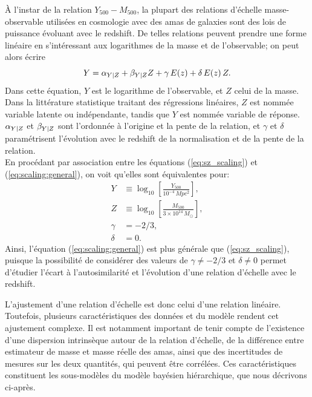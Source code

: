 À l'instar de la relation $Y_{500} - M_{500}$, la plupart des relations d'échelle masse-observable utilisées en cosmologie avec des amas de galaxies sont des lois de puissance évoluant avec le redshift.
De telles relations peuvent prendre une forme linéaire en s'intéressant aux logarithmes de la masse et de l'observable; on peut alors écrire
\begin{equation}
    \label{eq:scaling:general}
    Y = \alpha_{Y|Z} + \beta_{Y|Z} Z + \gamma \, E(z) + \delta \, E(z) \, Z.
\end{equation}
Dans cette équation, $Y$ est le logarithme de l'observable, et $Z$ celui de la masse\footnotemark.
Dans la littérature statistique traitant des régressions linéaires, $Z$ est nommée variable latente ou indépendante, tandis que $Y$ est nommée variable de réponse.
$\alpha_{Y|Z}$ et $\beta_{Y|Z}$ sont l'ordonnée à l'origine et la pente de la relation, et $\gamma$ et $\delta$ paramétrisent l'évolution avec le redshift de la normalisation et de la pente de la relation. \\
En procédant par association entre les équations (\ref{eq:sz_scaling}) et (\ref{eq:scaling:general}), on voit qu'elles sont équivalentes pour:
\begin{align}
    \nonumber Y &\equiv \log_{10} \left[\frac{Y_{500}}{10^{-4} \,\unit{Mpc^2}}\right], \\
    \nonumber Z &\equiv \log_{10} \left[\frac{M_{500}}{3 \times 10^{14} \,M_\odot}\right], \\
    \nonumber \gamma &= -2/3, \\
    \delta &= 0.
    \label{eq:scaling:sz}
\end{align}
Ainsi, l'équation (\ref{eq:scaling:general}) est plus générale que (\ref{eq:sz_scaling}), puisque la possibilité de considérer des valeurs de $\gamma \neq -2/3$ et $\delta \neq 0$ permet d'étudier l'écart à l'autosimilarité et l'évolution d'une relation d'échelle avec le redshift.

L'ajustement d'une relation d'échelle est donc celui d'une relation linéaire.
Toutefois, plusieurs caractéristiques des données et du modèle rendent cet ajustement complexe.
Il est notamment important de tenir compte de l'existence d'une dispersion intrinsèque autour de la relation d'échelle, de la différence entre estimateur de masse et masse réelle des amas, ainsi que des incertitudes de mesures sur les deux quantités, qui peuvent être corrélées.
Ces caractéristiques constituent les sous-modèles du modèle bayésien hiérarchique, que nous décrivons ci-après.

